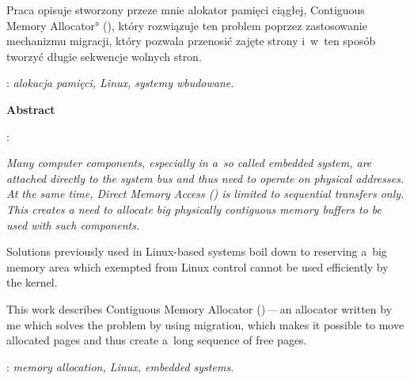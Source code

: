 \begin{titlepage}
{      Praca opisuje stworzony przeze mnie alokator pamięci ciągłej,
      \ang{Contiguous Memory Allocator} (), który rozwiązuje ten
      problem poprzez zastosowanie mechanizmu migracji, który pozwala
      przenosić zajęte strony i~w~ten sposób tworzyć długie sekwencje
      wolnych stron.}

    \vspace*{1\baselineskip}

    : {\itshape alokacja pamięci, Linux,
      systemy wbudowane.}
    \par
    \vspace{4\baselineskip}
    \begin{center}
        {\large\bfseries Abstract}\par\bigskip
    \end{center}
    : {\itshape \theengishtitle}\par
    \vspace*{1\baselineskip}

    {\itshape Many computer components, especially in a~so called
      embedded system, are attached directly to the system bus and thus
      need to operate on physical addresses.  At the same time, Direct
      Memory Access () is limited to sequential transfers only.
      This creates a need to allocate big physically contiguous memory
      buffers to be used with such components.

      Solutions previously used in Linux-based systems boil down to
      reserving a~big memory area which exempted from Linux control
      cannot be used efficiently by the kernel.

      This work describes Contiguous Memory Allocator
      ()\,---\,an allocator written by me which solves the
      problem by using migration, which makes it possible to move
      allocated pages and thus create a~long sequence of free pages.}
    \vspace*{1\baselineskip}

    : {\itshape memory allocation, Linux,
      embedded systems.}

\end{titlepage}
